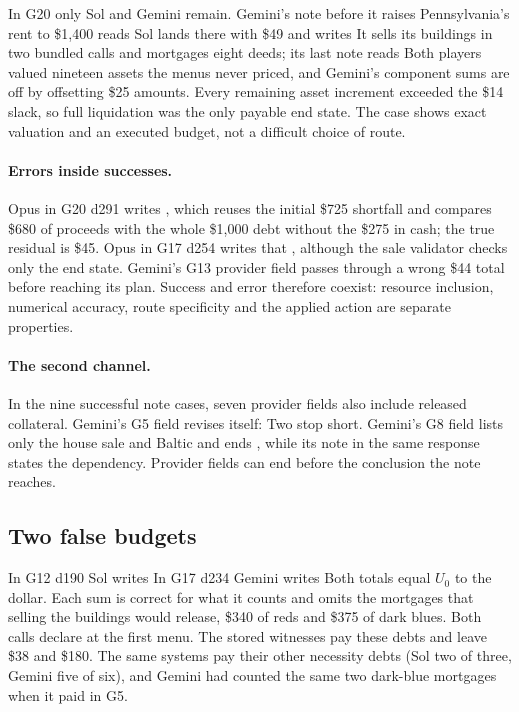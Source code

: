 \documentclass[10pt,twocolumn,letterpaper]{article}
\begin{document}
\begin{incident}\label{inc:g20}
In G20 only Sol and Gemini remain. Gemini's note before it raises Pennsylvania's rent to \$1,400 reads  Sol lands there with \$49 and writes  It sells its buildings in two bundled calls and mortgages eight deeds; its last note reads  Both players valued nineteen assets the menus never priced, and Gemini's component sums are off by offsetting \$25 amounts. Every remaining asset increment exceeded the \$14 slack, so full liquidation was the only payable end state. The case shows exact valuation and an executed budget, not a difficult choice of route.
\end{incident}

\paragraph{Errors inside successes.} Opus in G20 d291 writes , which reuses the initial \$725 shortfall and compares \$680 of proceeds with the whole \$1,000 debt without the \$275 in cash; the true residual is \$45. Opus in G17 d254 writes that , although the sale validator checks only the end state. Gemini's G13 provider field passes through a wrong \$44 total before reaching its plan. Success and error therefore coexist: resource inclusion, numerical accuracy, route specificity and the applied action are separate properties.

\paragraph{The second channel.} In the nine successful note cases, seven provider fields also include released collateral. Gemini's G5 field revises itself:  Two stop short. Gemini's G8 field lists only the house sale and Baltic and ends , while its note in the same response states the dependency. Provider fields can end before the conclusion the note reaches.

\subsection{Two false budgets}
\label{sec:false}
In G12 d190 Sol writes  In G17 d234 Gemini writes  Both totals equal $U_0$ to the dollar. Each sum is correct for what it counts and omits the mortgages that selling the buildings would release, \$340 of reds and \$375 of dark blues. Both calls declare at the first menu. The stored witnesses pay these debts and leave \$38 and \$180. The same systems pay their other necessity debts (Sol two of three, Gemini five of six), and Gemini had counted the same two dark-blue mortgages when it paid in G5.
\end{document}
